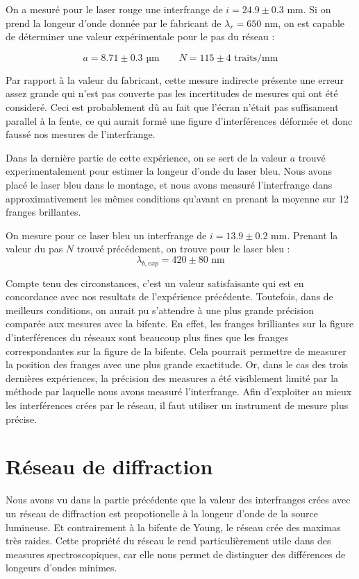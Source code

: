 \documentclass{article}
\begin{document}
On a mesuré pour le laser rouge une interfrange de $i = 24.9 \pm 0.3 \textrm{ mm}$. Si on prend la longeur d'onde donnée 
par le fabricant de $\lambda_r = 650 \textrm{ nm}$, on est capable de déterminer une valeur expérimentale pour le pas du réseau :

$$ a = 8.71 \pm 0.3 \textrm{ µm} \qquad N = 115 \pm 4 \textrm{ traits/mm}$$

Par rapport à la valeur du fabricant, cette mesure indirecte présente une erreur assez grande qui n'est pas couverte pas les incertitudes de 
mesures qui ont été consideré. Ceci est probablement dû au fait que l'écran n'était pas suffisament parallel à la fente, ce qui aurait formé une 
figure d'interférences déformée et donc faussé nos mesures de l'interfrange.

Dans la dernière partie de cette expérience, on se sert de la valeur $a$ trouvé experimentalement pour estimer la longeur d'onde du laser bleu.
Nous avons placé le laser bleu dans le montage, et nous avons measuré l'interfrange dans approximativement les mêmes conditions qu'avant en prenant la moyenne sur 12 franges brillantes.

On mesure pour ce laser bleu un interfrange de $i = 13.9 \pm 0.2 \textrm{ mm}$. Prenant la valeur du pas $N$ trouvé précédement, on trouve pour le laser bleu :
$$\lambda_{b, exp} = 420 \pm 80 \textrm{ nm}$$

Compte tenu des circonstances, c'est un valeur satisfaisante qui est en concordance avec nos resultats de l'expérience précédente. Toutefois, dans de meilleurs conditions, 
on aurait pu s'attendre à une plus grande précision comparée aux mesures avec la bifente. En effet, les franges brilliantes sur la figure d'interférences du réseaux sont beaucoup plus 
fines que les franges correspondantes sur la figure de la bifente. Cela pourrait permettre de measurer la position des franges avec une plus grande exactitude. 
Or, dans le cas des trois dernières expériences, la précision des measures a été visiblement limité par la méthode par laquelle nous avons measuré l'interfrange. 
Afin d'exploiter au mieux les interférences crées par le réseau, il faut utiliser un instrument de mesure plus précise.




\section{Réseau de diffraction}

Nous avons vu dans la partie précédente que la valeur des interfranges crées avec un réseau de diffraction est propotionelle 
à la longeur d'onde de la source lumineuse. Et contrairement à la bifente de Young, le réseau crée des maximas très raides. 
Cette propriété du réseau le rend particulièrement utile dans des measures spectroscopiques, car elle nous permet de distinguer des différences de longeurs d'ondes minimes.
\end{document}
